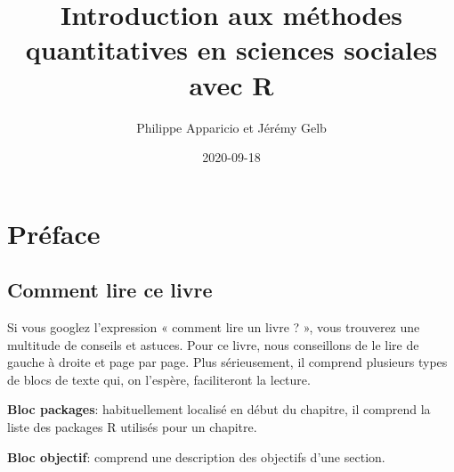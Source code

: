 \documentclass[
  11pt,
  french,
]{book}
\title{Introduction aux méthodes quantitatives en sciences sociales avec R}
\author{Philippe Apparicio et Jérémy Gelb}
\date{2020-09-18}
\makeatletter
\newenvironment{kframev}{%
\medskip{}
\setlength{\fboxsep}{.8em}
 \def\at@end@of@kframev{}%
 \ifinner\ifhmode%
  \def\at@end@of@kframev{\end{minipage}}%
  \begin{minipage}{\columnwidth}%
 \fi\fi%
 \def\FrameCommand##1{\hskip\@totalleftmargin \hskip-\fboxsep
 \colorbox{shadebluecolor}{##1}\hskip-\fboxsep
     \hskip-\linewidth \hskip-\@totalleftmargin \hskip\columnwidth}%
 \MakeFramed {\advance\hsize-\width
   \@totalleftmargin\z@ \linewidth\hsize
   \@setminipage}}%
 {\par\unskip\endMakeFramed%
 \at@end@of@kframev}
\newenvironment{rmdblock}[1]
  {
  \begin{itemize}
  \renewcommand{\labelitemi}{
    \raisebox{-.7\height}[0pt][0pt]{
      {\setkeys{Gin}{width=3em,keepaspectratio}\texttt{[image: images/\#1]}}
    }
  }
  \setlength{\fboxsep}{1em}
  \begin{kframev}
  \small
  \item
  }
  {
  \end{kframev}
  \end{itemize}
  }
\newenvironment{bloc_package}
  {\begin{rmdblock}{package}}
  {\end{rmdblock}}
\newenvironment{bloc_objectif}
  {\begin{rmdblock}{objectif}}
  {\end{rmdblock}}
\makeatother
\begin{document}
\maketitle




\renewcommand*\contentsname{Table des matières}
{
\hypersetup{linkcolor=}
\setcounter{tocdepth}{2}
\tableofcontents
}
\listoftables
\listoffigures
\hypertarget{pruxe9face}{%
\chapter*{Préface}\label{pruxe9face}}

\hypertarget{comment-lire-ce-livre}{%
\section*{Comment lire ce livre}\label{comment-lire-ce-livre}}

Si vous googlez l'expression « comment lire un livre ? », vous trouverez une multitude de conseils et astuces. Pour ce livre, nous conseillons de le lire de gauche à droite et page par page. Plus sérieusement, il comprend plusieurs types de blocs de texte qui, on l'espère, faciliteront la lecture.

\begin{bloc_package}

\textbf{Bloc packages}: habituellement localisé en début du chapitre, il comprend la liste des packages R utilisés pour un chapitre.

\end{bloc_package}

\begin{bloc_objectif}

\textbf{Bloc objectif}: comprend une description des objectifs d'une section.

\end{bloc_objectif}
\end{document}
